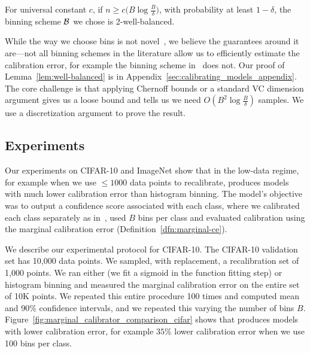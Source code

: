 \newcommand{\wellBalancedText}{
For universal constant $c$, if $n \geq c \big(B\log{\frac{B}{\delta}}\big)$, with probability at least $1 - \delta$, the binning scheme $\bins{}$ we chose is 2-well-balanced.
}

\begin{lemma}
\label{lem:well-balanced}
\wellBalancedText{}
\end{lemma}

\newtheorem*{wellBalanced}{Restatement of Lemma~\ref{lem:well-balanced}}

While the way we choose bins is not novel~\cite{zadrozny2001calibrated}, we believe the guarantees around it are---not all binning schemes in the literature allow us to efficiently estimate the calibration error, for example the binning scheme in~\cite{guo2017calibration} does not. Our proof of Lemma~\ref{lem:well-balanced} is in Appendix~\ref{sec:calibrating_models_appendix}. The core challenge is that applying Chernoff bounds or a standard VC dimension argument gives us a loose bound and tells us we need $O(B^2\log{\frac{B}{\delta}})$ samples. We use a discretization argument to prove the result.

\subsection{Experiments}

Our experiments on CIFAR-10 and ImageNet show that in the low-data regime, for example when we use $\leq 1000$ data points to recalibrate, \ourcal{} produces models with much lower calibration error than histogram binning. The model's objective was to output a confidence score associated with each class, where we calibrated each class separately as in~\cite{zadrozny2002transforming}, used $B$ bins per class and evaluated calibration using the marginal calibration error (Definition~\ref{dfn:marginal-ce}).

We describe our experimental protocol for CIFAR-10.
The CIFAR-10 validation set has 10,000 data points. We sampled, with replacement, a recalibration set of 1,000 points. We ran either \ourcal{} (we fit a sigmoid in the function fitting step) or histogram binning and measured the marginal calibration error on the entire set of 10K points.
We repeated this entire procedure 100 times and computed mean and 90\% confidence intervals, and we repeated this varying the number of bins $B$. Figure~\ref{fig:marginal_calibrator_comparison_cifar} shows that \ourcal{} produces models with lower calibration error, for example $35\%$ lower calibration error when we use 100 bins per class.

